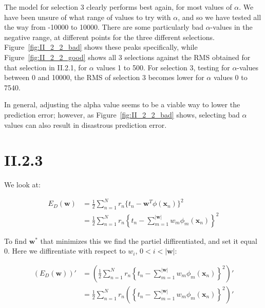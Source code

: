 The model for selection 3 clearly performs best again, for most values of $\alpha$. We have been
unsure of what range of values to try with $\alpha$, and so we have tested all the way from -10000 to 10000.
There are some particularly bad $\alpha$-values in the negative range, at different points for the three different
selections. Figure~\ref{fig:II_2_2_bad} shows these peaks specifically, while Figure~\ref{fig:II_2_2_good} 
shows all 3 selections against the RMS obtained for that selection in \textsc{II.2.1}, for $\alpha$ values 1 to 500.
For selection 3, testing for $\alpha$-values between 0 and 10000, the RMS of selection 3 becomes lower for $\alpha$ values
0 to 7540.

In general, adjusting the alpha value seems to be a viable way to lower the prediction error; however, 
as Figure~\ref{fig:II_2_2_bad} shows, selecting bad $\alpha$ values can also result in disastrous prediction error.


\section*{II.2.3}

We look at:

\begin{align*}
  E_D(\textbf{w}) &= \frac{1}{2} \sum_{n=1}^{N} r_n
                     \{t_n-\textbf{w}^T
                     \phi(\textbf{x}_n)\}^2 \\
                  &= \frac{1}{2} \sum_{n=1}^{N} r_n
                     \left\{t_n-\sum_{m=1}^{|\textbf{w}|}w_m
                     \phi_m(\textbf{x}_n)\right\}^2
\end{align*}

To find $\textbf{w}^*$ that minimizes this
we find the partiel diffirentiated,
and set it equal $0$.
Here we diffirentiate with respect to
$w_i$, $0 < i < |\textbf{w}|$:

\begin{align*}
  (E_D(\textbf{w}))' &= \left(\frac{1}{2} \sum_{n=1}^{N} r_n
                        \left\{t_n-\sum_{m=1}^{|\textbf{w}|}
                        w_m \phi_m(\textbf{x}_n)
                        \right\}^2\right)'\\
                     &= \frac{1}{2} \sum_{n=1}^{N}
                        r_n \left(
                        \left\{t_n-\sum_{m=1}^{|\textbf{w}|}
                        w_m \phi_m
                        (\textbf{x}_n)\right\}^2\right)'
\end{align*}

